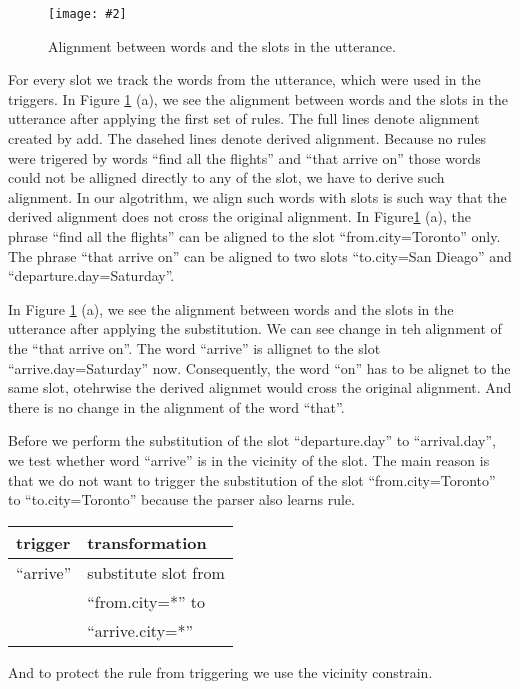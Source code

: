 \documentclass[11pt]{article}
\newcommand{\fgrparam}[4]{
  \begin{figure}[htbp]
    \begin{center}
      \leavevmode
      \texttt{[image: \#2]}
    \end{center}
    \caption{#4}
    \label{#3}
  \end{figure}
}
\begin{document}
\fgrparam{width=8cm}{./fig/words-slots-alignment.pdf}{fig:alignment}{Alignment between words and the slots in the utterance.}

For every slot we track the words from the utterance, which were used in the triggers. In Figure \ref{fig:alignment} (a), we see the alignment between words and the slots in the utterance after applying the first set of rules. The full lines denote alignment created by add.  The dasehed lines denote derived alignment. Because no rules were trigered by words ``find all the flights'' and ``that arrive on'' those words could not be alligned directly to any of the slot, we have to derive such alignment. In our algotrithm, we align such words with slots is such way that the derived alignment does not cross the original alignment. In Figure\ref{fig:alignment} (a), the phrase ``find all the flights'' can be aligned to the slot ``from.city=Toronto'' only. The phrase ``that arrive on'' can be aligned to two slots ``to.city=San Dieago'' and ``departure.day=Saturday''.

In Figure \ref{fig:alignment} (a), we see the alignment between words and the slots in the utterance after applying the substitution. We can see change in teh alignment of the ``that arrive on''. The word ``arrive'' is allignet to the slot ``arrive.day=Saturday'' now. Consequently, the word ``on'' has to be alignet to the same slot, otehrwise the derived alignmet would cross the original alignment.
And there is no change in the alignment of the word ``that''. 

Before we perform the substitution of the slot ``departure.day'' to ``arrival.day'', we test whether word ``arrive'' is in the vicinity of the slot. The main reason is that we do not want to trigger the substitution of the slot ``from.city=Toronto'' to ``to.city=Toronto'' because the parser also learns rule.

\vspace{.25cm}
\begin{tabular}{ll}
  trigger & transformation \\
  \hline 
  ``arrive''            & substitute slot from\\
                        & ``from.city=*'' to \\
                        & ``arrive.city=*'' \\
\end{tabular} 
\vspace{.25cm}

And to protect the rule from triggering we use the vicinity constrain.
\end{document}
